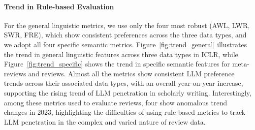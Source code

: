 \paragraph{Trend in Rule-based Evaluation}
For the general linguistic metrics, we use only the four most robust (AWL, LWR, SWR, FRE), which show consistent preferences across the three data types, and we adopt all four specific semantic metrics.
Figure~\ref{fig:trend_general} illustrates the trend in general linguistic features across three data types in ICLR, while Figure~\ref{fig:trend_specific} shows the trend in specific semantic features for meta-reviews and reviews. 
Almost all the metrics show consistent LLM preference trends across their associated data types, with an overall year-on-year increase, supporting the rising trend of LLM penetration in scholarly writing.
Interestingly, among these metrics used to evaluate reviews, four show anomalous trend changes in 2023, highlighting the difficulties of using rule-based metrics to track LLM penetration in the complex and varied nature of review data.







